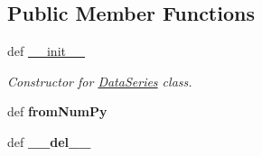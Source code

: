 \subsection*{Public Member Functions}
\begin{DoxyCompactItemize}
\item 
def \hyperlink{classpython_1_1telplugins_1_1_data_series_aa29eec3b2aa8cd3b2b0a4c4316325e10}{\-\_\-\-\_\-init\-\_\-\-\_\-}
\begin{DoxyCompactList}\small\item\em Constructor for \hyperlink{classpython_1_1telplugins_1_1_data_series}{Data\-Series} class. \end{DoxyCompactList}\item 
\hypertarget{classpython_1_1telplugins_1_1_data_series_abc33f2a0ecd52e6f28f47fe86a9e37b5}{def {\bfseries from\-Num\-Py}}\label{classpython_1_1telplugins_1_1_data_series_abc33f2a0ecd52e6f28f47fe86a9e37b5}

\item 
\hypertarget{classpython_1_1telplugins_1_1_data_series_ad4944df5b1f228d59f1e0b89d89424e3}{def {\bfseries \-\_\-\-\_\-del\-\_\-\-\_\-}}\label{classpython_1_1telplugins_1_1_data_series_ad4944df5b1f228d59f1e0b89d89424e3}


\end{DoxyCompactItemize}
